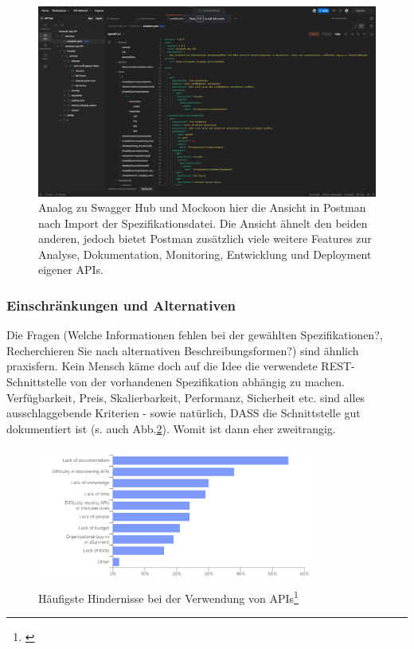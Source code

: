 \documentclass[notitlepage, hidelinks]{article}
\begin{document}
\begin{figure}[H]
\centering
  \includegraphics[width=\textwidth]{images/apispecs5.png}
  \caption{Analog zu Swagger Hub und Mockoon hier die Ansicht in Postman nach Import der Spezifikationsdatei. Die Ansicht ähnelt den beiden anderen, jedoch bietet Postman zusätzlich viele weitere Features zur Analyse, Dokumentation, Monitoring, Entwicklung und Deployment eigener APIs.}
  \label{apispecs5}
\end{figure}

\subsubsection{Einschränkungen und Alternativen}

Die Fragen (Welche Informationen fehlen bei der gewählten Spezifikationen?, Recherchieren Sie nach alternativen Beschreibungsformen?) sind ähnlich praxisfern. Kein Mensch käme doch auf die Idee die verwendete REST-Schnittstelle von der vorhandenen Spezifikation abhängig zu machen. Verfügbarkeit, Preis, Skalierbarkeit, Performanz, Sicherheit etc. sind alles ausschlaggebende Kriterien - sowie natürlich, DASS die Schnittstelle gut dokumentiert ist (s. auch Abb.\ref{stateofapiobstaclesconsumtion}). Womit ist dann eher zweitrangig. 

\begin{figure}[H]
\centering
  \includegraphics[width=350px]{images/stateofapiobstaclesconsumtion.png}
  \caption{Häufigste Hindernisse bei der Verwendung von APIs\protect\footnote{\cite{api-postman}}}
  \label{stateofapiobstaclesconsumtion}
\end{figure}
\end{document}
